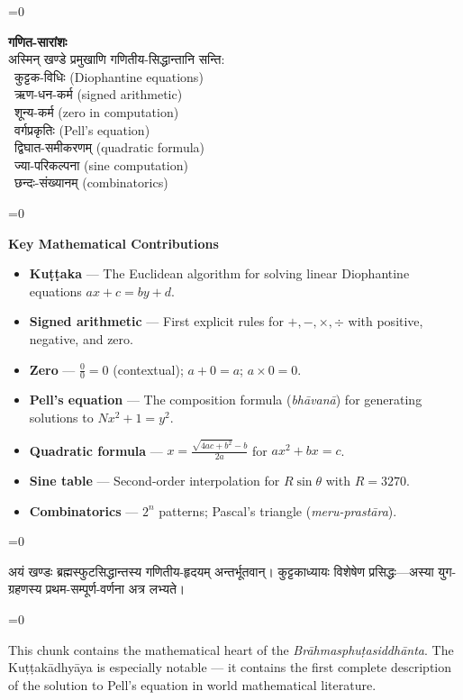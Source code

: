 \documentclass[11pt,a4paper]{article}
\newcommand{\dev}[1]{{\devanagarifont\color{sktcolor}#1}}
\newcommand{\iast}[1]{\textit{#1}}
\newenvironment{paracol}[1]{\begingroup}{\endgroup}
\newcommand{\switchcolumn}[1][]{%
  \ifnum#1=0\relax\else\par\nobreak\vspace{0.5em}\par\nobreak\fi%
}
\begin{document}
\begin{paracol}{2}
\switchcolumn[0]
\dev{%
\textbf{गणित-सारांशः}\\[0.2cm]
अस्मिन् खण्डे प्रमुखाणि गणितीय-सिद्धान्तानि सन्ति:\\
\textbullet\ कुट्टक-विधिः (Diophantine equations)\\
\textbullet\ ऋण-धन-कर्म (signed arithmetic)\\
\textbullet\ शून्य-कर्म (zero in computation)\\
\textbullet\ वर्गप्रकृतिः (Pell's equation)\\
\textbullet\ द्विघात-समीकरणम् (quadratic formula)\\
\textbullet\ ज्या-परिकल्पना (sine computation)\\
\textbullet\ छन्दः-संख्यानम् (combinatorics)
}

\switchcolumn[1]
\textbf{Key Mathematical Contributions}\\[0.2cm]
\begin{itemize}[leftmargin=*]
  \item \textbf{Kuṭṭaka} — The Euclidean algorithm for solving
    linear Diophantine equations $ax + c = by + d$.
  \item \textbf{Signed arithmetic} — First explicit rules for
    $+, -, \times, \div$ with positive, negative, and zero.
  \item \textbf{Zero} — $\frac{0}{0} = 0$ (contextual); $a + 0 = a$;
    $a \times 0 = 0$.
  \item \textbf{Pell's equation} — The composition formula
    (\iast{bhāvanā}) for generating solutions to $Nx^2 + 1 = y^2$.
  \item \textbf{Quadratic formula} — $x = \frac{\sqrt{4ac+b^2}-b}{2a}$
    for $ax^2 + bx = c$.
  \item \textbf{Sine table} — Second-order interpolation for
    $R\sin\theta$ with $R = 3270$.
  \item \textbf{Combinatorics} — $2^n$ patterns; Pascal's triangle
    (\iast{meru-prastāra}).
\end{itemize}
\end{paracol}

\vspace{0.5cm}

\begin{paracol}{2}
\switchcolumn[0]
\dev{%
अयं खण्डः ब्रह्मस्फुटसिद्धान्तस्य गणितीय-हृदयम् अन्तर्भूतवान्।
कुट्टकाध्यायः विशेषेण प्रसिद्धः—अस्या युग-ग्रहणस्य
प्रथम-सम्पूर्ण-वर्णना अत्र लभ्यते।
}

\switchcolumn[1]
This chunk contains the mathematical heart of the
\textit{Brāhmasphuṭasiddhānta}. The Kuṭṭakādhyāya is especially
notable — it contains the first complete description of the
solution to Pell's equation in world mathematical literature.
\end{paracol}
\end{document}
